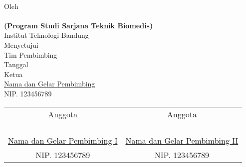 \clearpage
\pagestyle{empty}

\begin{center}    
	\renewcommand{\baselinestretch}{1}
    \large{\bfseries \MakeUppercase{\thetitle}}
    \\[2\baselineskip]

    \normalsize{Oleh\\
    	\textbf{\theauthor}\\
    	\textbf{(Program Studi Sarjana Teknik Biomedis)}
    	\\[\baselineskip]
    	Institut Teknologi Bandung}
    \\[3\baselineskip]
    
    
    \normalsize{Menyetujui\\
    	Tim Pembimbing
    	\\[\baselineskip]
    	Tanggal \thedate\\[3\baselineskip]
    	Ketua\\[4\baselineskip]
    	\underline{Nama dan Gelar Pembimbing}\\
    	NIP. 123456789}
    \\[2\baselineskip]
    
    \normalsize{%
    \setlength{\tabcolsep}{12pt}
    \begin{tabular}{c@{\hskip 0.5in}c}
    	Anggota & Anggota \\
    	& \\
    	& \\
    	& \\
    	& \\
    	\underline{Nama dan Gelar Pembimbing I} & \underline{Nama dan Gelar Pembimbing II} \\
    	NIP. 123456789 & NIP. 123456789 \\
    \end{tabular}
    }

\end{center}
\clearpage

